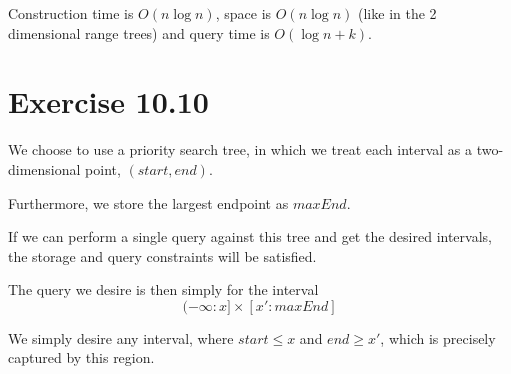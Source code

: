 \documentclass[11pt,a4paper]{article}
\begin{document}
Construction time is $O(n \log n)$, space is $O(n \log n)$ (like in
the 2 dimensional range trees) and query time is $O(\log n + k)$.

\section{Exercise 10.10}

We choose to use a priority search tree, in which we treat each
interval as a two-dimensional point, $(start, end)$.

Furthermore, we store the largest endpoint as $maxEnd$.

If we can perform a single query against this tree and get the desired
intervals, the storage and query constraints will be satisfied.

The query we desire is then simply for the interval \[
    (-\infty : x] \times [x' : maxEnd] 
\]

We simply desire any interval, where $start \leq x$ and
$end \geq x'$, which is precisely captured by this region.
\end{document}
